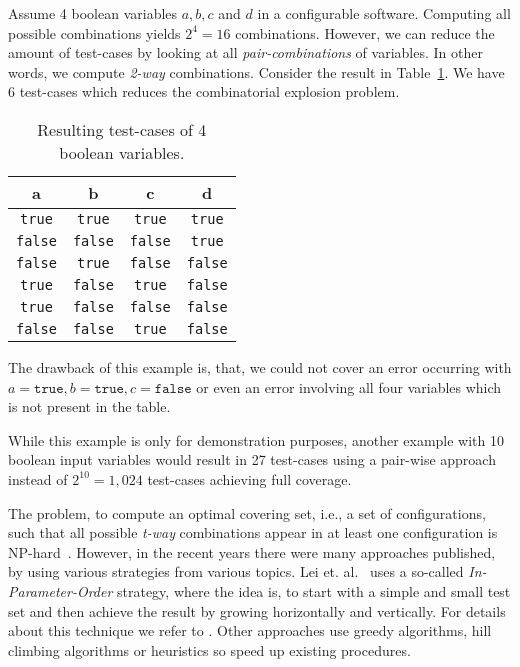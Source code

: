 \begin{example}
Assume 4 boolean variables $a,b,c$ and $d$ in a configurable software. Computing all possible combinations yields $2^4 = 16$ combinations. However, we can reduce the amount of test-cases by looking at all \emph{pair-combinations} of variables. In other words, we compute \emph{2-way} combinations. Consider the result in Table~\ref{fig:tcbool}. We have 6 test-cases which reduces the combinatorial explosion problem. 
\begin{table}
\centering
 \caption{Resulting test-cases of 4 boolean variables.}\label{fig:tcbool}
\begin{tabular}{c|c|c|c}
\textbf{a} & \textbf{b} & \textbf{c} & \textbf{d} \\ \hline
\verb|true| & \verb|true| & \verb|true| & \verb|true| \\ \hline

\verb|false| & \verb|false| & \verb|false| & \verb|true| \\ \hline

\verb|false| & \verb|true| & \verb|false| & \verb|false| \\ \hline

\verb|true| & \verb|false| & \verb|true| & \verb|false| \\ \hline

\verb|true| & \verb|false| & \verb|false| & \verb|false| \\ \hline

\verb|false| & \verb|false| & \verb|true| & \verb|false| 
\end{tabular}
\end{table}

The drawback of this example is, that, we could not cover an error occurring with $a = \mathtt{true}, b = \mathtt{true}, c = \mathtt{false}$ or even an error involving all four variables which is not present in the table. 

While this example is only for demonstration purposes, another example with 10 boolean input variables would result in 27 test-cases using a pair-wise approach instead of $2^{10} = 1,024$ test-cases achieving full coverage.
\end{example}

The problem, to compute an optimal covering set, i.e., a set of configurations, such that all possible \emph{t-way} combinations appear in at least one configuration is NP-hard~\cite{cov-arr-proof}.
However, in the recent years there were many approaches published, by using various strategies from various topics. Lei et. al.~\cite{IOP-comb} uses a so-called \emph{In-Parameter-Order} strategy, where the idea is, to start with a simple and small test set and then achieve the result by growing horizontally and vertically. For details about this technique we refer to \cite{IOP-comb}. Other approaches use greedy algorithms, hill climbing algorithms or heuristics so speed up existing procedures.\\


